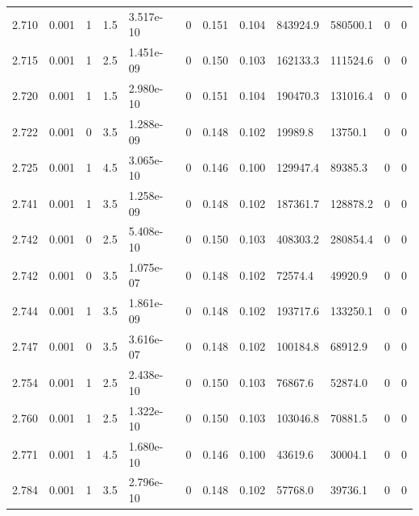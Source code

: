 \documentclass[preview]{standalone}
\begin{document}
{{{{{{\begin{tabular}{L{1.2cm}C{1.2cm} C{0.3cm}C{0.5cm} C{1.4cm}C{1.4cm} C{1.4cm}C{1.4cm} C{1.6cm}C{1.6cm} C{1.6cm}C{1.6cm}}
  2.710  &  0.001  & 1     & 1.5 &  3.517e-10  & 0  &  0.151&   0.104& 843924.9 & 580500.1   &  0 & 0  \\ 
  2.715  &  0.001  & 1     & 2.5 &  1.451e-09  & 0  &  0.150&   0.103& 162133.3 & 111524.6   &  0 & 0  \\ 
  2.720  &  0.001  & 1     & 1.5 &  2.980e-10  & 0  &  0.151&   0.104& 190470.3 & 131016.4   &  0 & 0  \\ 
  2.722  &  0.001  & 0     & 3.5 &  1.288e-09  & 0  &  0.148&   0.102& 19989.8 & 13750.1   &  0 & 0  \\ 
  2.725  &  0.001  & 1     & 4.5 &  3.065e-10  & 0  &  0.146&   0.100& 129947.4 & 89385.3   &  0 & 0  \\ 
  2.741  &  0.001  & 1     & 3.5 &  1.258e-09  & 0  &  0.148&   0.102& 187361.7 & 128878.2   &  0 & 0  \\ 
  2.742  &  0.001  & 0     & 2.5 &  5.408e-10  & 0  &  0.150&   0.103& 408303.2 & 280854.4   &  0 & 0  \\ 
  2.742  &  0.001  & 0     & 3.5 &  1.075e-07  & 0  &  0.148&   0.102& 72574.4 & 49920.9   &  0 & 0  \\ 
  2.744  &  0.001  & 1     & 3.5 &  1.861e-09  & 0  &  0.148&   0.102& 193717.6 & 133250.1   &  0 & 0  \\ 
  2.747  &  0.001  & 0     & 3.5 &  3.616e-07  & 0  &  0.148&   0.102& 100184.8 & 68912.9   &  0 & 0  \\ 
  2.754  &  0.001  & 1     & 2.5 &  2.438e-10  & 0  &  0.150&   0.103& 76867.6 & 52874.0   &  0 & 0  \\ 
  2.760  &  0.001  & 1     & 2.5 &  1.322e-10  & 0  &  0.150&   0.103& 103046.8 & 70881.5   &  0 & 0  \\ 
  2.771  &  0.001  & 1     & 4.5 &  1.680e-10  & 0  &  0.146&   0.100& 43619.6 & 30004.1   &  0 & 0  \\ 
  2.784  &  0.001  & 1     & 3.5 &  2.796e-10  & 0  &  0.148&   0.102& 57768.0 & 39736.1   &  0 & 0  \\ 
\hline 
\end{tabular} 

}}}}}}
\end{document}
